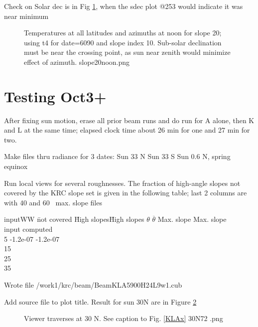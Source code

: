 \documentclass{article}
\begin{document}
Check on Solar dec is in Fig \ref{slope20noon}, when the sdec plot @253 would indicate it was near minimum

\begin{figure}[!ht] 
\caption[slope20noon]{Temperatures at all latitudes and azimuths at noon for
  slope 20\qd; using t4 for date=6090 and slope index 10. Sub-solar declination
  must be near the crossing point, as sun near zenith would minimize effect of
  azimuth.
\label{slope20noon}  slope20noon.png  }
\end{figure} 


 \section{Testing Oct3+}
After fixing sun motion, erase all prior beam runs and do run for A alone, then
K and L at the same time; elapsed clock time about 26 min for one and 27 min for
two.

Make files thru radiance for 3 dates:
 Sun 33 N
 Sun 33 S
 Sun 0.6 N, spring equinox

 Run local views for several roughnesses. The fraction of high-angle slopes not
 covered by the KRC slope set is given in the following table; last 2 columns are
 with 40 and 60\qd~ max. slope files
\begin{tabbing}
inputWW \= not covered \=  High slopes\= High slopes \kill
$\theta$ \> $\overline{\theta}$ \> Max. slope \>  Max. slope \\
input   \> computed \qd  {}\qd \\
5   \> -1.2e-07 \>  -1.2e-07 \\
15    \\
25      \\
35   \>      \\
\end{tabbing}

 Wrote file /work1/krc/beam/BeamKLA5900H24L9w1.cub


Add source file to plot title. Result for sun 30N are in Figure 
\ref{30N72}
\begin{figure}[!ht] 
\caption[Beam profiles with Sun 30N]{Viewer traverses at 30 N. See caption to Fig. \ref{KLAx}
\label{30N72} 30N72 .png  }
\end{figure} 
\end{document}
